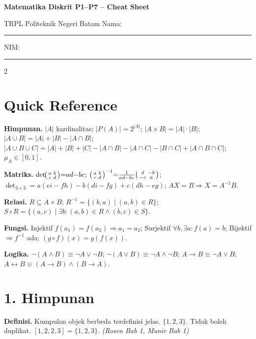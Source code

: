 \documentclass[8pt,a4paper]{extarticle}
\newcommand{\h}[1]{\textbf{#1}}
\newcommand{\src}[1]{\textit{(#1)}}
\begin{document}
\begin{center}
	{\large\bfseries Matematika Diskrit P1--P7 \;--\; Cheat Sheet}\\
	{\scriptsize TRPL Politeknik Negeri Batam \quad Nama: \rule{3.5cm}{0.3pt} \quad NIM: \rule{2cm}{0.3pt}}
\end{center}

\vspace{-6pt}
\begin{multicols*}{2}

	\section*{Quick Reference}

	\h{Himpunan.} $|A|$ kardinalitas; $|P(A)|{=}2^{|A|}$; $|A\times B|{=}|A|\cdot|B|$; $|A\cup B|{=}|A|{+}|B|{-}|A\cap B|$; $|A\cup B\cup C|{=}|A|{+}|B|{+}|C|{-}|A\cap B|{-}|A\cap C|{-}|B\cap C|{+}|A\cap B\cap C|$; $\mu_A\in[0,1]$.

	\h{Matriks.} $\det\!\begin{psmallmatrix}a&b\\c&d\end{psmallmatrix}{=}ad{-}bc$; $\begin{psmallmatrix}a&b\\c&d\end{psmallmatrix}^{-1}{=}\frac{1}{ad{-}bc}\begin{psmallmatrix}d&{-}b\\{-}c&a\end{psmallmatrix}$; $\det_{3\times3}{=}a(ei{-}fh){-}b(di{-}fg){+}c(dh{-}eg)$; $AX{=}B\Rightarrow X{=}A^{-1}B$.

	\h{Relasi.} $R\subseteq A\times B$; $R^{-1}{=}\{(b,a)\mid(a,b)\in R\}$; $S\circ R{=}\{(a,c)\mid\exists b:(a,b)\in R\wedge(b,c)\in S\}$.

	\h{Fungsi.} Injektif $f(a_1){=}f(a_2)\Rightarrow a_1{=}a_2$; Surjektif $\forall b,\exists a:f(a){=}b$; Bijektif $\Rightarrow f^{-1}$ ada; $(g\circ f)(x){=}g(f(x))$.

	\h{Logika.} $\neg(A\wedge B){\equiv}\neg A\vee\neg B$; $\neg(A\vee B){\equiv}\neg A\wedge\neg B$; $A\to B{\equiv}\neg A\vee B$; $A\leftrightarrow B{\equiv}(A\to B)\wedge(B\to A)$.

	\section*{1. Himpunan}

	\h{Definisi.} Kumpulan objek berbeda terdefinisi jelas. $\{1,2,3\}$. Tidak boleh duplikat. $[1,2,2,3]{=}\{1,2,3\}$. \src{Rosen Bab 1, Munir Bab 1}


\end{multicols*}
\end{document}
